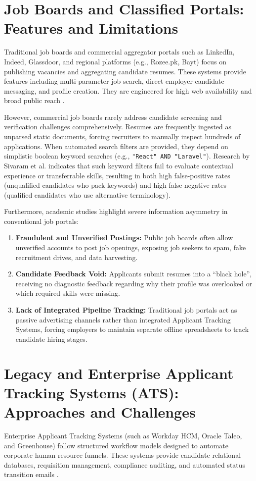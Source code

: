 \section{Job Boards and Classified Portals: Features and Limitations}
Traditional job boards and commercial aggregator portals such as LinkedIn, Indeed, Glassdoor, and regional platforms (e.g., Rozee.pk, Bayt) focus on publishing vacancies and aggregating candidate resumes. These systems provide features including multi-parameter job search, direct employer-candidate messaging, and profile creation. They are engineered for high web availability and broad public reach \cite{alotaibi2012survey}.

However, commercial job boards rarely address candidate screening and verification challenges comprehensively. Resumes are frequently ingested as unparsed static documents, forcing recruiters to manually inspect hundreds of applications. When automated search filters are provided, they depend on simplistic boolean keyword searches (e.g., \texttt{"React" AND "Laravel"}). Research by Sivaram et al. \cite{sivaram2022nlp} indicates that such keyword filters fail to evaluate contextual experience or transferrable skills, resulting in both high false-positive rates (unqualified candidates who pack keywords) and high false-negative rates (qualified candidates who use alternative terminology).

Furthermore, academic studies highlight severe information asymmetry in conventional job portals:
\begin{enumerate}
    \item \textbf{Fraudulent and Unverified Postings:} Public job boards often allow unverified accounts to post job openings, exposing job seekers to spam, fake recruitment drives, and data harvesting.
    \item \textbf{Candidate Feedback Void:} Applicants submit resumes into a ``black hole'', receiving no diagnostic feedback regarding why their profile was overlooked or which required skills were missing.
    \item \textbf{Lack of Integrated Pipeline Tracking:} Traditional job portals act as passive advertising channels rather than integrated Applicant Tracking Systems, forcing employers to maintain separate offline spreadsheets to track candidate hiring stages.
\end{enumerate}

\section{Legacy and Enterprise Applicant Tracking Systems (ATS): Approaches and Challenges}
Enterprise Applicant Tracking Systems (such as Workday HCM, Oracle Taleo, and Greenhouse) follow structured workflow models designed to automate corporate human resource funnels. These systems provide candidate relational databases, requisition management, compliance auditing, and automated status transition emails \cite{parasuraman2021ats}.

